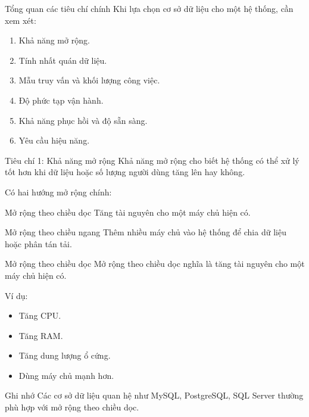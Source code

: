 \documentclass[aspectratio=169,11pt]{beamer}
\newcommand{\smallitem}{\setlength{\itemsep}{2pt}\setlength{\parskip}{0pt}}
\begin{document}
\begin{frame}{Tổng quan các tiêu chí chính}
Khi lựa chọn cơ sở dữ liệu cho một hệ thống, cần xem xét:
\begin{enumerate}
  \smallitem
  \item Khả năng mở rộng.
  \item Tính nhất quán dữ liệu.
  \item Mẫu truy vấn và khối lượng công việc.
  \item Độ phức tạp vận hành.
  \item Khả năng phục hồi và độ sẵn sàng.
  \item Yêu cầu hiệu năng.
\end{enumerate}
\end{frame}

\begin{frame}{Tiêu chí 1: Khả năng mở rộng}
Khả năng mở rộng cho biết hệ thống có thể xử lý tốt hơn khi dữ liệu hoặc số lượng người dùng tăng lên hay không.

\vspace{2mm}
Có hai hướng mở rộng chính:
\begin{block}{Mở rộng theo chiều dọc}
Tăng tài nguyên cho một máy chủ hiện có.
\end{block}
\begin{block}{Mở rộng theo chiều ngang}
Thêm nhiều máy chủ vào hệ thống để chia dữ liệu hoặc phân tán tải.
\end{block}
\end{frame}

\begin{frame}{Mở rộng theo chiều dọc}
Mở rộng theo chiều dọc nghĩa là tăng tài nguyên cho một máy chủ hiện có.

\vspace{2mm}
Ví dụ:
\begin{itemize}
  \smallitem
  \item Tăng CPU.
  \item Tăng RAM.
  \item Tăng dung lượng ổ cứng.
  \item Dùng máy chủ mạnh hơn.
\end{itemize}

\begin{block}{Ghi nhớ}
Các cơ sở dữ liệu quan hệ như MySQL, PostgreSQL, SQL Server thường phù hợp với mở rộng theo chiều dọc.
\end{block}
\end{frame}
\end{document}
